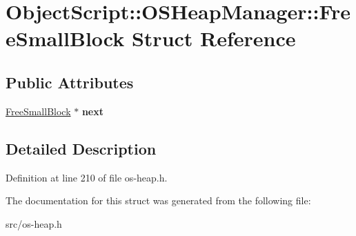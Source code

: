 \hypertarget{struct_object_script_1_1_o_s_heap_manager_1_1_free_small_block}{}\section{Object\+Script\+:\+:O\+S\+Heap\+Manager\+:\+:Free\+Small\+Block Struct Reference}
\label{struct_object_script_1_1_o_s_heap_manager_1_1_free_small_block}
\subsection*{Public Attributes}
\begin{DoxyCompactItemize}
\item 
\hyperlink{struct_object_script_1_1_o_s_heap_manager_1_1_free_small_block}{Free\+Small\+Block} $\ast$ {\bfseries next}\hypertarget{struct_object_script_1_1_o_s_heap_manager_1_1_free_small_block_ac57029634e13a70075eb5e505a2a4a50}{}\label{struct_object_script_1_1_o_s_heap_manager_1_1_free_small_block_ac57029634e13a70075eb5e505a2a4a50}

\end{DoxyCompactItemize}


\subsection{Detailed Description}


Definition at line 210 of file os-\/heap.\+h.



The documentation for this struct was generated from the following file\+:\begin{DoxyCompactItemize}
\item 
src/os-\/heap.\+h\end{DoxyCompactItemize}
